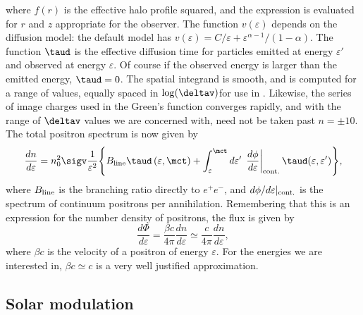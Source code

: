 where $f(r)$ is the effective halo profile squared, and the expression is
evaluated for $r$ and $z$ appropriate for the observer.  The function
$v(\varepsilon)$ depends on the diffusion model: the default model has
$v(\varepsilon)=C/\varepsilon+\varepsilon^{\alpha-1}/(1-\alpha)$.  The function
$\taud$ is the effective diffusion time for particles emitted at energy
$\varepsilon'$ and observed at energy $\varepsilon$.  Of course if the
observed energy is larger than the emitted energy, $\taud=0$.  The spatial
integrand is smooth, and is computed for a range of values, equally spaced in
$\log(\deltav)$\@ for use in \ds.  Likewise, the series of image charges used
in the Green's function converges rapidly, and with the range of
$\deltav$ values we are concerned with, need not be taken past $n=\pm 10$\@.
The total positron spectrum is now given by
\begin{equation}
   \frac{dn}{d\varepsilon}=n_0^2\sigv\frac{1}{\varepsilon^2}\Bigg\{B_{\rm
   line}\taud
   \left(\varepsilon,\mct\right)+\int_{\varepsilon}^{\mct}d\varepsilon'\,
   \left.\frac{d\phi}{d\varepsilon}\right|_{\rm
   cont.}\taud(\varepsilon,\varepsilon') \Bigg\},
\label{eq:dndefinal}
\end{equation}
where $B_{\rm line}$ is the branching ratio directly to $e^+e^-$, and
$d\phi/d\varepsilon|_{\rm cont.}$ is the spectrum of continuum positrons per
annihilation.  Remembering that this is an expression for the number density of
positrons, the flux is given by
\begin{equation}
   \frac{d\Phi}{d\varepsilon} = \frac{\beta c}{4 \pi} \frac{dn}{d\varepsilon}
   \simeq \frac{c}{4 \pi} \frac{dn}{d\varepsilon},
\end{equation}
where $\beta c$ is the velocity of a positron of energy
$\varepsilon$\@.  For the energies we are interested in, $\beta c
\simeq c$ is a very well justified approximation.



\subsection{Solar modulation}

